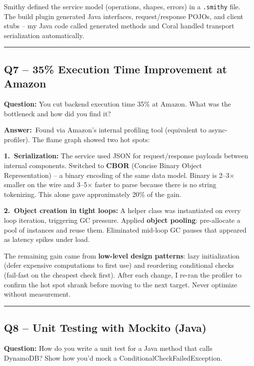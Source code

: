 \documentclass[letterpaper,10pt]{article}
\newlength{\boxwidth}
\newcommand{\questionbox}[1]{%
  \vspace{6pt}%
  \noindent\colorbox{qbg}{%
    \begin{minipage}{\boxwidth}%
      \vspace{3pt}\textbf{\textcolor{nordblue}{Question:}} #1\vspace{3pt}%
    \end{minipage}%
  }\vspace{2pt}%
}
\newcommand{\answerlabel}{\noindent\textbf{\textcolor{answerblue}{Answer:}}~}
\begin{document}
Smithy defined the service model (operations, shapes, errors) in a \texttt{.smithy} file. The build plugin generated Java interfaces, request/response POJOs, and client stubs -- my Java code called generated methods and Coral handled transport serialization automatically.

\medskip\rule{\linewidth}{0.2pt}

\subsection*{Q7 -- 35\% Execution Time Improvement at Amazon}

\questionbox{You cut backend execution time 35\% at Amazon. What was the bottleneck and how did you find it?}

\answerlabel Found via Amazon's internal profiling tool (equivalent to async-profiler). The flame graph showed two hot spots:

\textbf{1.~Serialization:} The service used JSON for request/response payloads between internal components. Switched to \textbf{CBOR} (Concise Binary Object Representation) -- a binary encoding of the same data model. Binary is 2--3$\times$ smaller on the wire and 3--5$\times$ faster to parse because there is no string tokenizing. This alone gave approximately 20\% of the gain.

\textbf{2.~Object creation in tight loops:} A helper class was instantiated on every loop iteration, triggering GC pressure. Applied \textbf{object pooling}: pre-allocate a pool of instances and reuse them. Eliminated mid-loop GC pauses that appeared as latency spikes under load.

The remaining gain came from \textbf{low-level design patterns}: lazy initialization (defer expensive computations to first use) and reordering conditional checks (fail-fast on the cheapest check first). After each change, I re-ran the profiler to confirm the hot spot shrank before moving to the next target. Never optimize without measurement.

\medskip\rule{\linewidth}{0.2pt}

\subsection*{Q8 -- Unit Testing with Mockito (Java)}

\questionbox{How do you write a unit test for a Java method that calls DynamoDB? Show how you'd mock a ConditionalCheckFailedException.}
\end{document}
